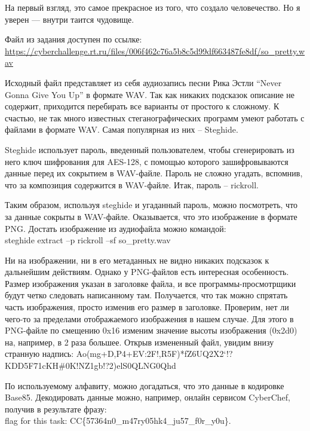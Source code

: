 
На первый взгляд, это самое прекрасное из того, что создало человечество. Но я уверен — внутри таится чудовище.

Файл из задания доступен по ссылке: \url{https://cyberchallenge.rt.ru/files/006f462c76a5b8c5d99df663487fe8df/so_pretty.wav}

\solutionSection

Исходный файл представляет из себя аудиозапись песни Рика Эстли “Never Gonna Give You Up” в формате WAV. Так как никаких подсказок описание не содержит, приходится перебирать все варианты от простого к сложному. К счастью, не так много известных стеганографических программ умеют работать с файлами в формате WAV. Самая популярная из них – Steghide.

Steghide использует пароль, введенный пользователем, чтобы сгенерировать из него ключ шифрования для AES-128, с помощью которого зашифровываются данные перед их сокрытием в WAV-файле. Пароль не сложно угадать, вспомнив, что за композиция содержится в WAV-файле. Итак, пароль – rickroll.


Таким образом, используя steghide и угаданный пароль, можно посмотреть, что за данные сокрыты в WAV-файле. Оказывается, что это изображение в формате PNG. Достать изображение из аудиофайла можно командой:\\
steghide extract –p rickroll –sf so\_pretty.wav

Ни на изображении, ни в его метаданных не видно никаких подсказок к дальнейшим действиям. Однако у PNG-файлов есть интересная особенность. Размер изображения указан в заголовке файла, и все программы-просмотрщики будут четко следовать написанному там. Получается, что так можно спрятать часть изображения, просто изменив его размер в заголовке. Проверим, нет ли чего-то за пределами отображаемого изображения в нашем случае. Для этого в PNG-файле по смещению 0x16 изменим значение высоты изображения (0x2d0) на, например, в 2 раза большее. Открыв измененный файл, увидим внизу странную надпись: 
Ao(mg+D,P4+EV:2F!,R5F)*fZ6UQ2X2`!?KDD5F71cKH\#0K!NZ1gb!?2)elS0QLNG0Qhd

По используемому алфавиту, можно догадаться, что это данные в кодировке Base85. Декодировать данные можно, например, онлайн сервисом CyberChef, получив в результате фразу:\\
flag for this task: CC\{57364n0\_m47ry05hk4\_ju57\_f0r\_y0u\}.

